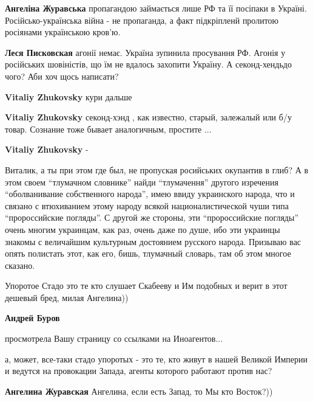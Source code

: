 \begin{itemize}
\begin{itemize}
\textbf{Ангеліна Журавська} пропагандою займається лише РФ та її посіпаки в Україні. Російсько-українська війна - не пропаганда, а факт підкріпленй пролитою росіянами українською кров'ю.

\textbf{Леся Писковская} агонії немає. Україна зупинила просування РФ. Агонія у російських шовіністів, що їм не вдалось захопити Україну. А секонд-хендьдо чого? Аби хоч щось написати?

\textbf{Vitaliy Zhukovsky} кури дальше

\textbf{Vitaliy Zhukovsky} секонд-хэнд , как известно, старый, залежалый или б/у товар. Сознание тоже бывает аналогичным, простите ...


\textbf{Vitaliy Zhukovsky} -

Виталик, а ты при этом где был, не пропуская росийських окупантив в глиб? А в этом
своем \enquote{тлумачном словнике} найди \enquote{тлумачення} другого изречения \enquote{оболванивание
собственного народа}, имею ввиду украинского народа, что и связано с втюхиванием
этому народу всякой националистической чуши типа \enquote{пророссийские погляды}. С
другой же стороны, эти \enquote{пророссийские погляды} очень многим украинцам, как
раз, очень даже по душе, ибо эти украинцы знакомы с величайшим культурным
достоянием русского народа. Призываю вас опять полистать этот, как
его, бишь, тлумачный словарь, там об этом многое сказано.

\end{itemize} %


Упоротое Стадо это те кто слушает Скабееву и Им подобных и верит в этот дешевый
бред, милая Ангелина))

\begin{itemize} %
\textbf{Андрей Буров} 

просмотрела Вашу страницу со ссылками на Иноагентов...

а, может, все-таки стадо упоротых - это те, кто живут в нашей Великой Империи и
ведутся на провокации Запада, агенты которого работают против нас?

\textbf{Ангелина Журавская} Ангелина, если есть Запад, то Мы кто Восток?))


\end{itemize}
\end{itemize}
